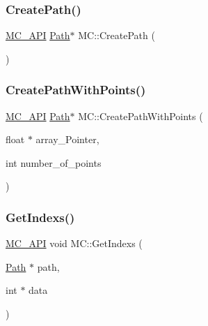 \mbox{\label{namespace_m_c_ac0beb59945ffd2b41606f7e78994f5f9}} 
\subsubsection{\texorpdfstring{CreatePath()}{CreatePath()}}
{\footnotesize\ttfamily \mbox{\hyperlink{_mesh___creator___controller_8hpp_a529916b90fdb2765a7b955fded854b0a}{M\+C\+\_\+\+A\+PI}} \mbox{\hyperlink{class_m_c_1_1_path}{Path}}$\ast$ M\+C\+::\+Create\+Path (\begin{DoxyParamCaption}{ }\end{DoxyParamCaption})}

\mbox{\label{namespace_m_c_ae0c8fc75717231f9bde51aa37da1ea58}} 
\subsubsection{\texorpdfstring{CreatePathWithPoints()}{CreatePathWithPoints()}}
{\footnotesize\ttfamily \mbox{\hyperlink{_mesh___creator___controller_8hpp_a529916b90fdb2765a7b955fded854b0a}{M\+C\+\_\+\+A\+PI}} \mbox{\hyperlink{class_m_c_1_1_path}{Path}}$\ast$ M\+C\+::\+Create\+Path\+With\+Points (\begin{DoxyParamCaption}\item[{float $\ast$}]{array\+\_\+\+Pointer,  }\item[{int}]{number\+\_\+of\+\_\+points }\end{DoxyParamCaption})}

\mbox{\label{namespace_m_c_ac9a93e4a54c5d89d0e21f40dcb67a8ef}} 
\subsubsection{\texorpdfstring{GetIndexs()}{GetIndexs()}}
{\footnotesize\ttfamily \mbox{\hyperlink{_mesh___creator___controller_8hpp_a529916b90fdb2765a7b955fded854b0a}{M\+C\+\_\+\+A\+PI}} void M\+C\+::\+Get\+Indexs (\begin{DoxyParamCaption}\item[{\mbox{\hyperlink{class_m_c_1_1_path}{Path}} $\ast$}]{path,  }\item[{int $\ast$}]{data }\end{DoxyParamCaption})}

